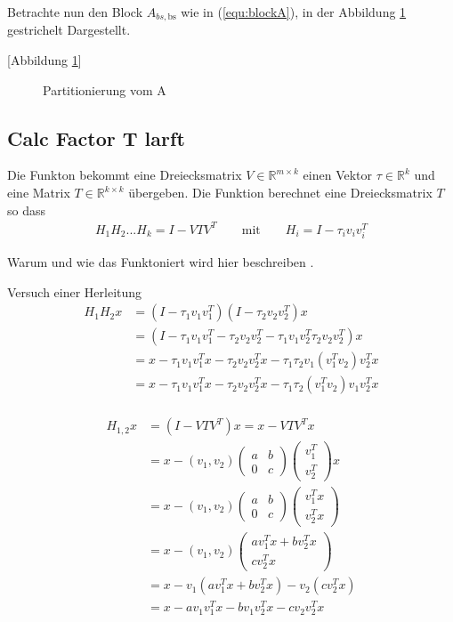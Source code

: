 Betrachte nun den Block $A_{bs, \text{bs}}$ wie in (\ref{equ:blockA}), in der Abbildung \ref{fig:blockA} gestrichelt Dargestellt.

[Abbildung \ref{fig:blockA}]
\begin{figure}
	\centering
	
	\caption{Partitionierung vom A}
	\label{fig:blockA}
\end{figure}

\subsection{Calc Factor T larft}

Die Funkton bekommt eine Dreiecksmatrix $V \in \mathbb{R}^{m \times k}$ einen Vektor $\tau \in \mathbb{R}^k$ und eine Matrix $T\in \mathbb{R}^{k\times k}$ übergeben. 
Die Funktion berechnet eine Dreiecksmatrix $T$ so dass
\begin{align*}
	H_1H_2...H_k = I - VTV^T \qquad \text{mit}\qquad H_i = I - \tau_i v_iv_i^T
\end{align*}

Warum und wie das Funktoniert wird hier beschreiben \cite{Joffrain:2006:AHT:1141885.1141886}.

Versuch einer Herleitung
\begin{align*}
	H_1 H_2 x &= (I-\tau_1 v_1 v_1^T)(I-\tau_2 v_2 v_2^T)x\\
	&= (I - \tau_1 v_1 v_1^T - \tau_2 v_2 v_2^T -  \tau_1 v_1 v_2^T \tau_2 v_2 v_2^T )x\\
  &= x - \tau_1 v_1 v_1^T x - \tau_2 v_2 v_2^T x - \tau_1 \tau_2 v_1 (v_1^T v_2 )v_2^T x\\
  &= x - \tau_1 v_1 v_1^T x - \tau_2 v_2 v_2^T x - \tau_1 \tau_2 (v_1^T v_2 ) v_1 v_2^T x\\
\end{align*}

\begin{align*}
  H_{1,2} x &= (I - V T V^T) x = x - V T V^T x\\
  &= x - (v_1, v_2)
  \begin{pmatrix}
    a & b \\ 0 & c
  \end{pmatrix}
  \begin{pmatrix}
    v_1^T \\ v_2^T 
  \end{pmatrix}
  x\\
  &= x - (v_1, v_2)
  \begin{pmatrix}
    a & b \\ 0 & c
  \end{pmatrix}
  \begin{pmatrix}
    v_1^T x \\ v_2^T x
  \end{pmatrix}\\
  &= x - (v_1, v_2)
  \begin{pmatrix}
    a v_1^T x + b v_2^T x\\  c v_2^T x
  \end{pmatrix}\\
  &= x - v_1(a v_1^T x + b v_2^T x) - v_2 (c v_2^T x)\\
  &= x - a v_1 v_1^T x - b v_1 v_2^T x - c v_2 v_2^T x
\end{align*}

